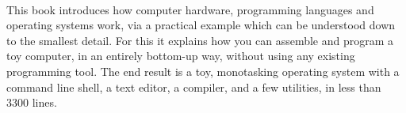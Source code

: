 
\thispagestyle{empty}~
\clearpage

\thispagestyle{empty}
\color{white}


\bigskip

\noindent This book introduces how computer hardware, programming languages and
operating systems work, via a practical example which can be understood down to
the smallest detail. For this it explains how you can assemble and program a
toy computer, in an entirely bottom-up way, without using any existing
programming tool. The end result is a toy, monotasking operating system with a
command line shell, a text editor, a compiler, and a few utilities, in less
than 3300 lines.

\noindent
{}

